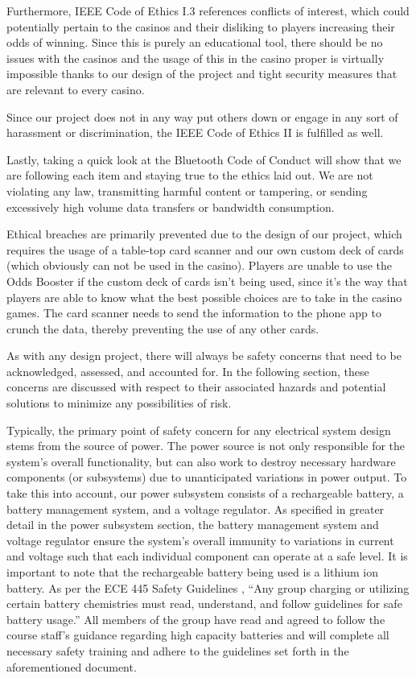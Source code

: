 \documentclass[12pt]{article}
\begin{document}
Furthermore, IEEE Code of Ethics I.3 \cite{IEEE_ethics} references conflicts of interest, which could potentially pertain to the casinos and their disliking to players increasing their odds of winning. Since this is purely an educational tool, there should be no issues with the casinos and the usage of this in the casino proper is virtually impossible thanks to our design of the project and tight security measures that are relevant to every casino.

Since our project does not in any way put others down or engage in any sort of harassment or discrimination, the IEEE Code of Ethics II \cite{IEEE_ethics} is fulfilled as well. 

Lastly, taking a quick look at the Bluetooth Code of Conduct \cite{BT_conduct} will show that we are following each item and staying true to the ethics laid out. We are not violating any law, transmitting harmful content or tampering, or sending excessively high volume data transfers or bandwidth consumption.

Ethical breaches are primarily prevented due to the design of our project, which requires the usage of a table-top card scanner and our own custom deck of cards (which obviously can not be used in the casino). Players are unable to use the Odds Booster if the custom deck of cards isn't being used, since it's the way that players are able to know what the best possible choices are to take in the casino games. The card scanner needs to send the information to the phone app to crunch the data, thereby preventing the use of any other cards. 

As with any design project, there will always be safety concerns that need to be acknowledged, assessed, and accounted for. In the following section, these concerns are discussed with respect to their associated hazards and potential solutions to minimize any possibilities of risk.

Typically, the primary point of safety concern for any electrical system design stems from the source of power. The power source is not only responsible for the system's overall functionality, but can also work to destroy necessary hardware components (or subsystems) due to unanticipated variations in power output. To take this into account, our power subsystem consists of a rechargeable battery, a battery management system, and a voltage regulator. As specified in greater detail in the power subsystem section, the battery management system and voltage regulator ensure the system's overall immunity to variations in current and voltage such that each individual component can operate at a safe level. It is important to note that the rechargeable battery being used is a lithium ion battery. As per the ECE 445 Safety Guidelines \cite{445_safety}, ``Any group charging or utilizing certain battery chemistries must read, understand, and follow guidelines for safe battery usage.'' All members of the group have read and agreed to follow the course staff's guidance regarding high capacity batteries \cite{Li_safety} and will complete all necessary safety training and adhere to the guidelines set forth in the aforementioned document. 
\end{document}
